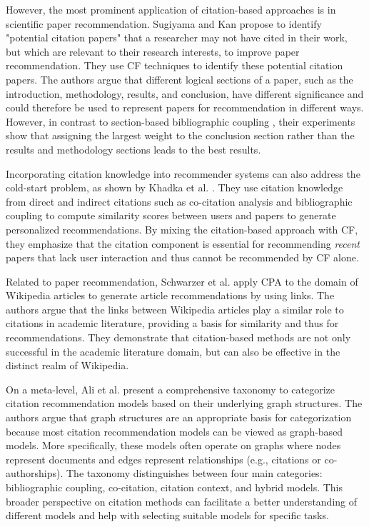 However, the most prominent application of citation-based approaches is in scientific paper recommendation.
Sugiyama and Kan \cite{SugiyamaExploitingPotential2013} propose to identify "potential citation papers" that a researcher may not have cited in their work, but which are relevant to their research interests, to improve paper recommendation.
They use \ac{CF} techniques to identify these potential citation papers. The authors argue that different logical sections of a paper, such as the introduction, methodology, results, and conclusion, have different significance and could therefore be used to represent papers for recommendation in different ways. However, in contrast to section-based bibliographic coupling \cite{HabibSectionsbasedBibliographic2019}, their experiments show that assigning the largest weight to the conclusion section rather than the results and methodology sections leads to the best results.

Incorporating citation knowledge into recommender systems can also address the cold-start problem, as shown by Khadka et al. \cite{KhadkaCapturingExploiting2020}.
They use citation knowledge from direct and indirect citations such as co-citation analysis and bibliographic coupling to compute similarity scores between users and papers to generate personalized recommendations.
By mixing the citation-based approach with \ac{CF}, they emphasize that the citation component is essential for recommending \emph{recent} papers that lack user interaction and thus cannot be recommended by \ac{CF} alone.

Related to paper recommendation, Schwarzer et al. \cite{SchwarzerEvaluatingLinkbased2016} apply \ac{CPA} to the domain of Wikipedia articles to generate article recommendations by using links.
The authors argue that the links between Wikipedia articles play a similar role to citations in academic literature, providing a basis for similarity and thus for recommendations.
They demonstrate that citation-based methods are not only successful in the academic literature domain, but can also be effective in the distinct realm of Wikipedia.

On a meta-level, Ali et al. \cite{AliGraphbasedTaxonomy2020} present a comprehensive taxonomy to categorize citation recommendation models based on their underlying graph structures. The authors argue that graph structures are an appropriate basis for categorization because most citation recommendation models can be viewed as graph-based models. More specifically, these models often operate on graphs where nodes represent documents and edges represent relationships (e.g., citations or co-authorships).
The taxonomy distinguishes between four main categories: bibliographic coupling, co-citation, citation context, and hybrid models. This broader perspective on citation methods can facilitate a better understanding of different models and help with selecting suitable models for specific tasks.
